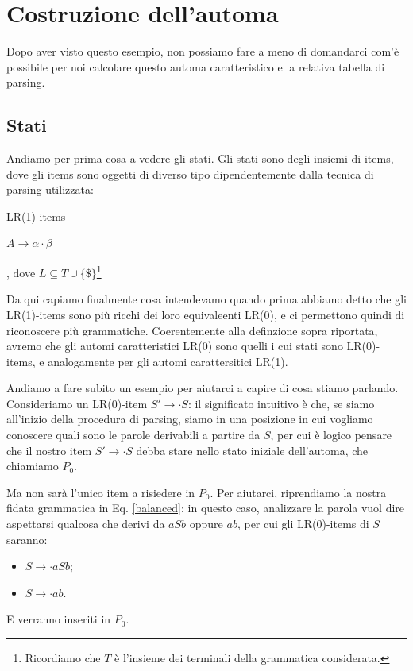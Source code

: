 \documentclass[class=book, crop=false, oneside, 12pt]{standalone}
\begin{document}
\section{Costruzione dell'automa}
Dopo aver visto questo esempio, non possiamo fare a meno di domandarci com'è possibile per noi calcolare questo automa caratteristico e la relativa tabella di parsing.

\subsection{Stati}
Andiamo per prima cosa a vedere gli stati. Gli stati sono degli insiemi di items, dove gli items sono oggetti di diverso tipo dipendentemente dalla tecnica di parsing utilizzata:
\begin{labeling}{LR(1)-items}
    \item[LR(0)-items] \(A \to \alpha \cdot \beta\)
    \item[LR(1)-items] [\(A \to \alpha \cdot \beta, L\)], dove \(L \subseteq T \cup \{\$\}\)\footnote{Ricordiamo che \(T\) è l'insieme dei terminali della grammatica considerata.}
\end{labeling}
Da qui capiamo finalmente cosa intendevamo quando prima abbiamo detto che gli LR(1)-items sono più ricchi dei loro equivaleenti LR(0), e ci permettono quindi di riconoscere più grammatiche. Coerentemente alla definzione sopra riportata, avremo che gli automi caratteristici LR(0) sono quelli i cui stati sono LR(0)-items, e analogamente per gli automi carattersitici LR(1).

Andiamo a fare subito un esempio per aiutarci a capire di cosa stiamo parlando. Consideriamo un LR(0)-item \(S' \to \cdot S\): il significato intuitivo è che, se siamo all'inizio della procedura di parsing, siamo in una posizione in cui vogliamo conoscere quali sono le parole derivabili a partire da \(S\), per cui è logico pensare che il nostro item \(S' \to \cdot S\) debba stare nello stato iniziale dell'automa, che chiamiamo \(P_0\).

Ma non sarà l'unico item a risiedere in \(P_0\). Per aiutarci, riprendiamo la nostra fidata grammatica in Eq. \ref{balanced}: in questo caso, analizzare la parola vuol dire aspettarsi qualcosa che derivi da \(aSb\) oppure \(ab\), per cui gli LR(0)-items di \(S\) saranno:
\begin{itemize}
    \item \(S \to \cdot aSb\);
    \item \(S \to \cdot ab\).
\end{itemize}
E verranno inseriti in \(P_0\).
\end{document}
